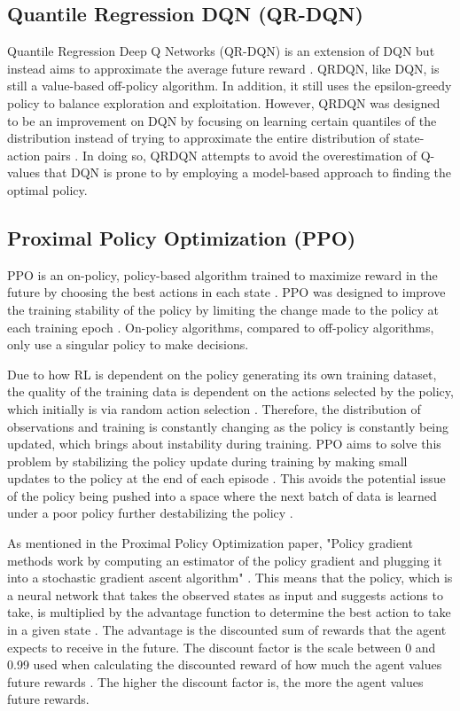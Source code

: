 \subsection{Quantile Regression DQN (QR-DQN)}

Quantile Regression Deep Q Networks (QR-DQN) is an extension of DQN but instead aims to approximate the average future reward \cite{dabney2018distributional}. QRDQN, like DQN, is still a value-based off-policy algorithm. In addition, it still uses the epsilon-greedy policy to balance exploration and exploitation. However, QRDQN was designed to be an improvement on DQN by focusing on learning certain quantiles of the distribution instead of trying to approximate the entire distribution of state-action pairs \cite{dabney2018distributional}. In doing so, QRDQN attempts to avoid the overestimation of Q-values that DQN is prone to by employing a model-based approach to finding the optimal policy.

\subsection{Proximal Policy Optimization (PPO)}

PPO is an on-policy, policy-based algorithm trained to maximize reward in the future by choosing the best actions in each state \cite{deepcheckRL}. PPO was designed to improve the training stability of the policy by limiting the change made to the policy at each training epoch \cite{ThomasSimonini2022A2C}. On-policy algorithms, compared to off-policy algorithms, only use a singular policy to make decisions.

Due to how RL is dependent on the policy generating its own training dataset, the quality of the training data is dependent on the actions selected by the policy, which initially is via random action selection \cite{XanderSteenbrugge2019ppo}. Therefore, the distribution of observations and training is constantly changing as the policy is constantly being updated, which brings about instability during training. PPO aims to solve this problem by stabilizing the policy update during training by making small updates to the policy at the end of each episode \cite{XanderSteenbrugge2019intro}. This avoids the potential issue of the policy being pushed into a space where the next batch of data is learned under a poor policy further destabilizing the policy \cite{XanderSteenbrugge2019ppo}.

As mentioned in the Proximal Policy Optimization paper, "Policy gradient methods work by computing an estimator of the policy gradient and plugging it into a stochastic gradient ascent algorithm" \cite{schulman2017proximal}. This means that the policy, which is a neural network that takes the observed states as input and suggests actions to take, is multiplied by the advantage function to determine the best action to take in a given state \cite{schulman2017proximal}. The advantage is the discounted sum of rewards that the agent expects to receive in the future. The discount factor is the scale between 0 and 0.99 used when calculating the discounted reward of how much the agent values future rewards \cite{XanderSteenbrugge2019ppo}. The higher the discount factor is, the more the agent values future rewards. 

